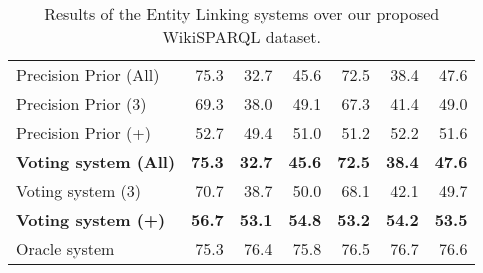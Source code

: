 \begin{table}[h!]
{\begin{tabular}{|l|rrr|rrr|}
    Precision Prior (All)                                  & 75.3                                 & 32.7                                    & 45.6                                   & 72.5                                 & 38.4                                    & 47.6                                   \\
    Precision Prior (3)                                    & 69.3                                 & 38.0                                    & 49.1                                   & 67.3                                 & 41.4                                    & 49.0                                   \\
    Precision Prior (+)                                    & 52.7                                 & 49.4                                    & 51.0                                   & 51.2                                 & 52.2                                    & 51.6                                   \\ \hline
    \textbf{Voting system (All)}                           & \textbf{75.3}                        & \textbf{32.7}                           & \textbf{45.6}                          & \textbf{72.5}                        & \textbf{38.4}                           & \textbf{47.6}                          \\
    Voting system (3)                                      & 70.7                                 & 38.7                                    & 50.0                                   & 68.1                                 & 42.1                                    & 49.7                                   \\
    \textbf{Voting system (+)}                             & \textbf{56.7}                        & \textbf{53.1}                           & \textbf{54.8}                          & \textbf{53.2}                        & \textbf{54.2}                           & \textbf{53.5}                          \\ \hline
    Oracle system                                          & 75.3                                 & 76.4                                    & 75.8                                   & 76.5                                 & 76.7                                    & 76.6                                   \\ \hline
    \end{tabular}%
    }
    \caption{Results of the Entity Linking systems over our proposed WikiSPARQL dataset.}
    \label{table:elResultsWikiSparql}
\end{table}

